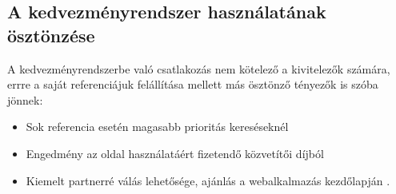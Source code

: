 \subsection{A kedvezményrendszer használatának ösztönzése}
A kedvezményrendszerbe való csatlakozás nem kötelező a kivitelezők számára, errre a saját referenciájuk felállítása mellett más ösztönző tényezők is szóba jönnek:
\begin{itemize}
\item Sok referencia esetén magasabb prioritás kereséseknél 
\item Engedmény az oldal használatáért fizetendő közvetítői díjból 
\item Kiemelt partnerré válás lehetősége, ajánlás a webalkalmazás kezdőlapján .
\end{itemize} 